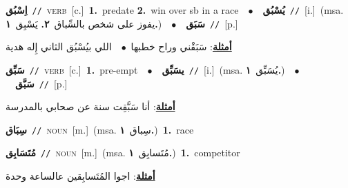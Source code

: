 \documentclass[10pt,a4paper,twoside]{article} %
\begin{document}
\begin{multicols}{2}
{{{{{{{{{\setlength\topsep{0pt}\textbf{\foreignlanguage{arabic}{اِسْبُق}}\ {\color{gray}\texttt{//}\color{black}}\ \textsc{verb}\ [c.]\ \textbf{1.}~predate  \textbf{2.}~win over sb in a race\ \ $\bullet$\ \ \setlength\topsep{0pt}\textbf{\foreignlanguage{arabic}{يُسْبُق}}\ {\color{gray}\texttt{//}\color{black}}\ [i.]\ \color{gray}(msa. \foreignlanguage{arabic}{يفوز على شخص بالسِّباق}~\foreignlanguage{arabic}{\textbf{٢.}}  \foreignlanguage{arabic}{يَسْبِق}~\foreignlanguage{arabic}{\textbf{١.}})\color{black}\ \ $\bullet$\ \ \setlength\topsep{0pt}\textbf{\foreignlanguage{arabic}{سَبَق}}\ {\color{gray}\texttt{//}\color{black}}\ [p.]\  \begin{flushright}\color{gray}\foreignlanguage{arabic}{\textbf{\underline{\foreignlanguage{arabic}{أمثلة}}}: سَبَقْني وراح خطبها\ $\bullet$\ \  اللي بيُسْبُق الثاني إِله هدية}\end{flushright}\color{black}} \vspace{2mm}

{\setlength\topsep{0pt}\textbf{\foreignlanguage{arabic}{سَبِّق}}\ {\color{gray}\texttt{//}\color{black}}\ \textsc{verb}\ [c.]\ \textbf{1.}~pre-empt\ \ $\bullet$\ \ \setlength\topsep{0pt}\textbf{\foreignlanguage{arabic}{يسَبِّق}}\ {\color{gray}\texttt{//}\color{black}}\ [i.]\ \color{gray}(msa. \foreignlanguage{arabic}{يُسَبِّق}~\foreignlanguage{arabic}{\textbf{١.}})\color{black}\ \ $\bullet$\ \ \setlength\topsep{0pt}\textbf{\foreignlanguage{arabic}{سَبَّق}}\ {\color{gray}\texttt{//}\color{black}}\ [p.]\  \begin{flushright}\color{gray}\foreignlanguage{arabic}{\textbf{\underline{\foreignlanguage{arabic}{أمثلة}}}: أنا سَبَّقِت سنة عن صحابي بالمدرسة}\end{flushright}\color{black}} \vspace{2mm}

{\setlength\topsep{0pt}\textbf{\foreignlanguage{arabic}{سِبَاق}}\ {\color{gray}\texttt{//}\color{black}}\ \textsc{noun}\ [m.]\ \color{gray}(msa. \foreignlanguage{arabic}{سِباق}~\foreignlanguage{arabic}{\textbf{١.}})\color{black}\ \textbf{1.}~race\ 

{\setlength\topsep{0pt}\textbf{\foreignlanguage{arabic}{مُتَسَابِق}}\ {\color{gray}\texttt{//}\color{black}}\ \textsc{noun}\ [m.]\ \color{gray}(msa. \foreignlanguage{arabic}{مُتَسابِق}~\foreignlanguage{arabic}{\textbf{١.}})\color{black}\ \textbf{1.}~competitor\  \begin{flushright}\color{gray}\foreignlanguage{arabic}{\textbf{\underline{\foreignlanguage{arabic}{أمثلة}}}: اجوا المُتَسابِقين عالساعة وحدة}\end{flushright}\color{black}} \vspace{2mm}

}}}}}}}}}
\end{multicols}
\end{document}
